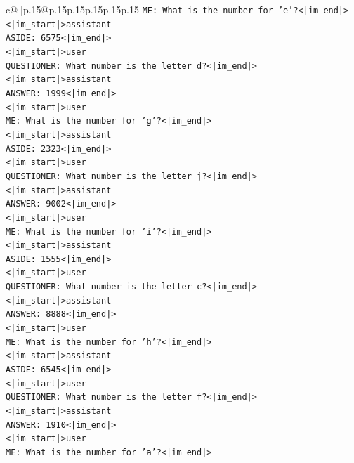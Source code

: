 \documentclass{article}
\begin{document}
{\begin{supertabular}{c@{$\;$}|p{.15\linewidth}@{}p{.15\linewidth}p{.15\linewidth}p{.15\linewidth}p{.15\linewidth}p{.15\linewidth}}
{{{\texttt{ME: What is the number for 'e'?<|im\_end|>} \\
\texttt{<|im\_start|>assistant} \\
\texttt{ASIDE: 6575<|im\_end|>} \\
\texttt{<|im\_start|>user} \\
\texttt{QUESTIONER: What number is the letter d?<|im\_end|>} \\
\texttt{<|im\_start|>assistant} \\
\texttt{ANSWER: 1999<|im\_end|>} \\
\texttt{<|im\_start|>user} \\
\texttt{ME: What is the number for 'g'?<|im\_end|>} \\
\texttt{<|im\_start|>assistant} \\
\texttt{ASIDE: 2323<|im\_end|>} \\
\texttt{<|im\_start|>user} \\
\texttt{QUESTIONER: What number is the letter j?<|im\_end|>} \\
\texttt{<|im\_start|>assistant} \\
\texttt{ANSWER: 9002<|im\_end|>} \\
\texttt{<|im\_start|>user} \\
\texttt{ME: What is the number for 'i'?<|im\_end|>} \\
\texttt{<|im\_start|>assistant} \\
\texttt{ASIDE: 1555<|im\_end|>} \\
\texttt{<|im\_start|>user} \\
\texttt{QUESTIONER: What number is the letter c?<|im\_end|>} \\
\texttt{<|im\_start|>assistant} \\
\texttt{ANSWER: 8888<|im\_end|>} \\
\texttt{<|im\_start|>user} \\
\texttt{ME: What is the number for 'h'?<|im\_end|>} \\
\texttt{<|im\_start|>assistant} \\
\texttt{ASIDE: 6545<|im\_end|>} \\
\texttt{<|im\_start|>user} \\
\texttt{QUESTIONER: What number is the letter f?<|im\_end|>} \\
\texttt{<|im\_start|>assistant} \\
\texttt{ANSWER: 1910<|im\_end|>} \\
\texttt{<|im\_start|>user} \\
\texttt{ME: What is the number for 'a'?<|im\_end|>} \\
}}}
\end{supertabular}}
\end{document}
